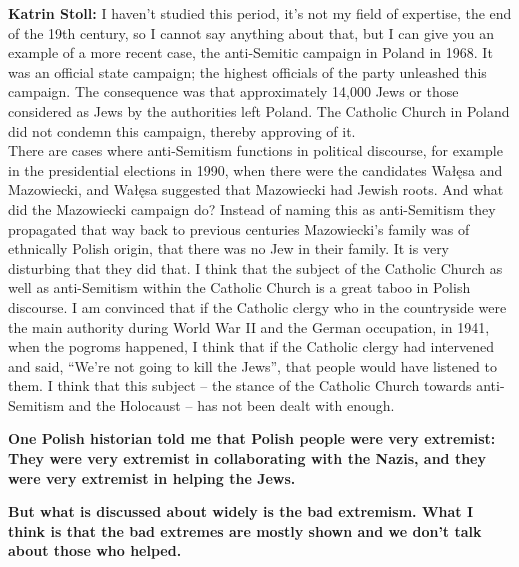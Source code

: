 \textbf{Katrin Stoll:} I haven’t studied this period, it’s not my field of expertise, the end of the 19th century, so I cannot say anything about that, but I can give you an example of a more recent case, the anti-Semitic campaign in Poland in 1968. It was an official state campaign; the highest officials of the party unleashed this campaign. The consequence was that approximately 14,000 Jews or those considered as Jews by the authorities left Poland. The Catholic Church in Poland did not condemn this campaign, thereby approving of it.\\ There are cases where anti-Semitism functions in political discourse, for example in the presidential elections in 1990, when there were the candidates Wałęsa and Mazowiecki, and Wałęsa suggested that Mazowiecki had Jewish roots. And what did the Mazowiecki campaign do? Instead of naming this as anti-Semitism they propagated that way back to previous centuries Mazowiecki’s family was of ethnically Polish origin, that there was no Jew in their family. It is very disturbing that they did that. I think that the subject of the Catholic Church as well as anti-Semitism within the Catholic Church is a great taboo in Polish discourse. I am convinced that if the Catholic clergy who in the countryside were the main authority during World War II and the German occupation, in 1941, when the pogroms happened, I think that if the Catholic clergy had intervened and said, ``We're not going to kill the Jews'', that people would have listened to them. I think that this subject – the stance of the Catholic Church towards anti-Semitism and the Holocaust – has not been dealt with enough. 





\textbf{One Polish historian told me that Polish people were very extremist: They were very extremist in collaborating with the Nazis, and they were very extremist in helping the Jews.}\par 
\textbf{But what is discussed about widely is the bad extremism. What I think is that the bad extremes are mostly shown and we don’t talk about those who helped.}

